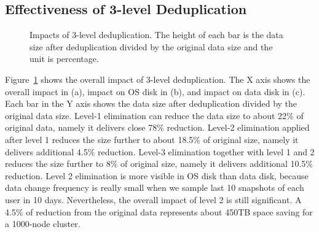 


\subsection{Effectiveness of 3-level Deduplication}

\begin{figure}
  \centering
  \caption{Impacts of 3-level deduplication. The height of each bar is the data size after 
deduplication divided by the original data size and the unit is percentage. }

  \label{fig:overall}
\end{figure}

Figure~\ref{fig:overall} shows the overall impact of 3-level deduplication.
The X axis shows the overall impact in (a),  impact on OS disk in (b), and impact on data disk in (c).
Each bar in the Y axis shows the data size after deduplication divided by the original data size.
Level-1 elimination can reduce the data size to about 22\% of original data, namely it delivers close 78\% reduction.
Level-2 elimination applied after level 1
reduces the size further to about 18.5\% of original size, namely it delivers additional 4.5\% reduction.
Level-3 elimination together with level 1 and 2
reduces the size further to 8\% of original size, namely it delivers additional 10.5\% reduction.
Level 2 elimination is more visible in OS disk than data disk, because data change frequency is really small
when we sample last 10 snapshots of each user in 10 days. Nevertheless, the overall impact of level 2 is still significant.
A 4.5\% of reduction from the original data represents about 450TB space saving for a 1000-node cluster.


